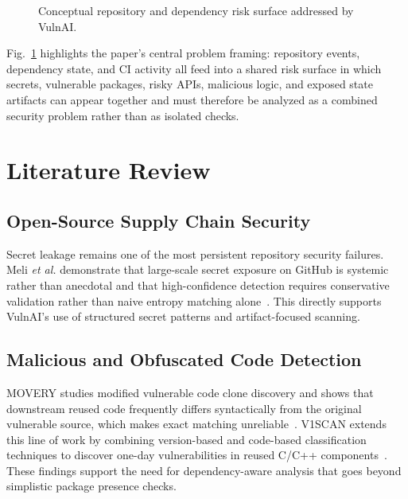 \documentclass[conference]{IEEEtran}
\begin{document}
\begin{figure}[htbp]
\centering
{}
\caption{Conceptual repository and dependency risk surface addressed by VulnAI.}
\label{fig:risk_surface}
\end{figure}

Fig.~\ref{fig:risk_surface} highlights the paper's central problem framing: repository events, dependency state, and CI activity all feed into a shared risk surface in which secrets, vulnerable packages, risky APIs, malicious logic, and exposed state artifacts can appear together and must therefore be analyzed as a combined security problem rather than as isolated checks.

\section{Literature Review}
\subsection{Open-Source Supply Chain Security}
Secret leakage remains one of the most persistent repository security failures. Meli \emph{et al.} demonstrate that large-scale secret exposure on GitHub is systemic rather than anecdotal and that high-confidence detection requires conservative validation rather than naive entropy matching alone~\cite{meli2019how}. This directly supports VulnAI's use of structured secret patterns and artifact-focused scanning.

\subsection{Malicious and Obfuscated Code Detection}
MOVERY studies modified vulnerable code clone discovery and shows that downstream reused code frequently differs syntactically from the original vulnerable source, which makes exact matching unreliable~\cite{woo2022movery}. V1SCAN extends this line of work by combining version-based and code-based classification techniques to discover one-day vulnerabilities in reused C/C++ components~\cite{woo2023v1scan}. These findings support the need for dependency-aware analysis that goes beyond simplistic package presence checks.
\end{document}
